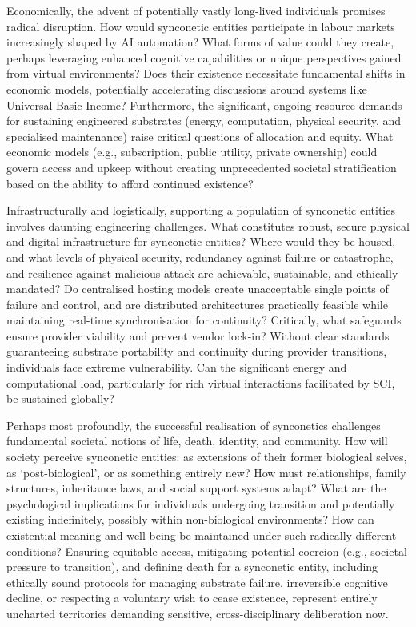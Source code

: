 \documentclass[10pt]{article}
\begin{document}
\begin{sloppypar}
  Economically, the advent of potentially vastly long-lived individuals promises radical disruption. How would synconetic entities participate in labour markets increasingly shaped by AI automation? What forms of value could they create, perhaps leveraging enhanced cognitive capabilities or unique perspectives gained from virtual environments? Does their existence necessitate fundamental shifts in economic models, potentially accelerating discussions around systems like Universal Basic Income? Furthermore, the significant, ongoing resource demands for sustaining engineered substrates (energy, computation, physical security, and specialised maintenance) raise critical questions of allocation and equity. What economic models (e.g., subscription, public utility, private ownership) could govern access and upkeep without creating unprecedented societal stratification based on the ability to afford continued existence?

  Infrastructurally and logistically, supporting a population of synconetic entities involves daunting engineering challenges. What constitutes robust, secure physical and digital infrastructure for synconetic entities? Where would they be housed, and what levels of physical security, redundancy against failure or catastrophe, and resilience against malicious attack are achievable, sustainable, and ethically mandated? Do centralised hosting models create unacceptable single points of failure and control, and are distributed architectures practically feasible while maintaining real-time synchronisation for continuity? Critically, what safeguards ensure provider viability and prevent vendor lock-in? Without clear standards guaranteeing substrate portability and continuity during provider transitions, individuals face extreme vulnerability. Can the significant energy and computational load, particularly for rich virtual interactions facilitated by SCI, be sustained globally?

  Perhaps most profoundly, the successful realisation of synconetics challenges fundamental societal notions of life, death, identity, and community. How will society perceive synconetic entities: as extensions of their former biological selves, as ‘post-biological’, or as something entirely new? How must relationships, family structures, inheritance laws, and social support systems adapt? What are the psychological implications for individuals undergoing transition and potentially existing indefinitely, possibly within non-biological environments? How can existential meaning and well-being be maintained under such radically different conditions? Ensuring equitable access, mitigating potential coercion (e.g., societal pressure to transition), and defining death for a synconetic entity, including ethically sound protocols for managing substrate failure, irreversible cognitive decline, or respecting a voluntary wish to cease existence, represent entirely uncharted territories demanding sensitive, cross-disciplinary deliberation now.


\end{sloppypar}
\end{document}

